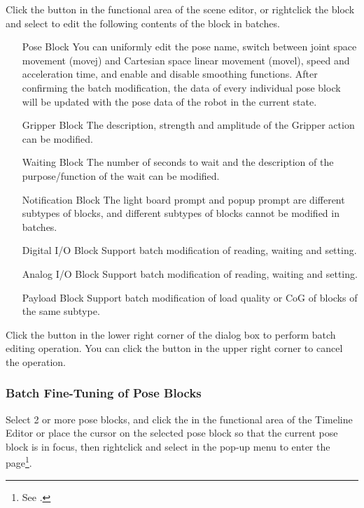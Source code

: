Click the  button in the functional area of the scene editor, or right­click the block and select  to edit the following contents of the block in batches.

\begin{itemize}[leftmargin=7.5em]
\item [Pose Block] You can uniformly edit the pose name, switch between joint space movement (movej) and Cartesian space linear movement (movel), speed and acceleration time, and enable and disable smoothing functions. After confirming the batch modification, the data of every individual pose block will be updated with the pose data of the robot in the current state.
\item [Gripper Block] The description, strength and amplitude of the Gripper action can be modified.
\item [Waiting Block] The number of seconds to wait and the description of the purpose/function of the wait can be modified.
\item [Notification Block] The light board prompt and pop­up prompt are different sub­types of blocks, and different sub­types of blocks cannot be modified in batches.
\item [Digital I/O Block] Support batch modification of reading, waiting and setting.
\item [Analog I/O Block] Support batch modification of reading, waiting and setting.
\item [Payload Block] Support batch modification of load quality or CoG of blocks of the same subtype.
\end{itemize}

Click the  button in the lower right corner of the dialog box to perform batch editing operation. You can click the \kbd{$\times$} button in the upper right corner to cancel the operation.



\subsubsection{Batch Fine-Tuning of Pose Blocks}
Select 2 or more pose blocks, and click the  in the functional area of the Timeline Editor or place the cursor on the selected pose block so that the current pose block is in focus, then right­click and select  in the pop-up menu to enter the  page\footnote{See .}.

